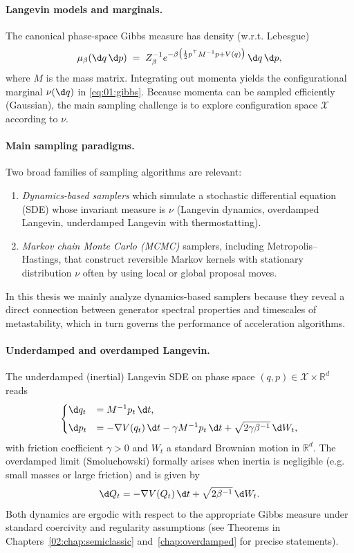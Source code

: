 \paragraph{Langevin models and marginals.}
The canonical phase-space Gibbs measure has density (w.r.t. Lebesgue)
\[
\mu_\beta(\d q\,\d p) \;=\; Z_\beta^{-1} e^{-\beta\big(\frac12 p^\top M^{-1} p + V(q)\big)}\,\d q\,\d p,
\]
where $M$ is the mass matrix. Integrating out momenta yields the configurational marginal $\nu(\d q)$ in \eqref{eq:01:gibbs}. Because momenta
can be sampled efficiently (Gaussian), the main sampling challenge is to explore configuration space $\mathcal X$ according to $\nu$.

\paragraph{Main sampling paradigms.} Two broad families of sampling algorithms are relevant:
\begin{enumerate}
    \item \emph{Dynamics-based samplers} which simulate a stochastic differential equation (SDE) whose invariant measure is $\nu$ (Langevin dynamics,
    overdamped Langevin, underdamped Langevin with thermostatting).
    \item \emph{Markov chain Monte Carlo (MCMC)} samplers, including Metropolis--Hastings, that construct reversible Markov kernels with stationary
    distribution $\nu$ often by using local or global proposal moves.
\end{enumerate}
In this thesis we mainly analyze dynamics-based samplers because they reveal a direct connection between generator spectral properties and
timescales of metastability, which in turn governs the performance of acceleration algorithms.

\paragraph{Underdamped and overdamped Langevin.}
The underdamped (inertial) Langevin SDE on phase space $(q,p)\in\mathcal X\times\mathbb R^{d}$ reads
\begin{equation}\label{eq:01:underdamped_langevin}
    \begin{cases}
        \d q_t &= M^{-1} p_t\,\d t,\\[4pt]
        \d p_t &= -\nabla V(q_t)\,\d t -\gamma M^{-1} p_t\,\d t + \sqrt{2\gamma\beta^{-1}}\,\d W_t,
    \end{cases}
\end{equation}
with friction coefficient $\gamma>0$ and $W_t$ a standard Brownian motion in $\mathbb R^d$. The overdamped limit (Smoluchowski) formally arises
when inertia is negligible (e.g. small masses or large friction) and is given by
\begin{equation}\label{eq:01:overdamped_langevin}
    \d Q_t = -\nabla V(Q_t)\,\d t + \sqrt{2\beta^{-1}}\,\d W_t.
\end{equation}
Both dynamics are ergodic with respect to the appropriate Gibbs measure under standard coercivity and regularity assumptions (see Theorems
in Chapters~\ref{02:chap:semiclassic} and~\ref{chap:overdamped} for precise statements).

